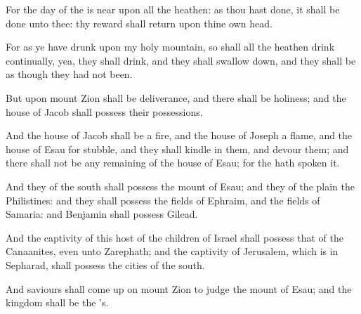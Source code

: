 \verse For the day of the \LORD is near upon all the heathen: as thou hast done, it shall be done unto thee: thy reward shall return upon thine own head.

\verse For as ye have drunk upon my holy mountain, so shall all the heathen drink continually, yea, they shall drink, and they shall swallow down, and they shall be as though they had not been.

\verse But upon mount Zion shall be deliverance, and there shall be holiness; and the house of Jacob shall possess their possessions.

\verse And the house of Jacob shall be a fire, and the house of Joseph a flame, and the house of Esau for stubble, and they shall kindle in them, and devour them; and there shall not be any remaining of the house of Esau; for the \LORD hath spoken it.

\verse And they of the south shall possess the mount of Esau; and they of the plain the Philistines: and they shall possess the fields of Ephraim, and the fields of Samaria: and Benjamin shall possess Gilead.

\verse And the captivity of this host of the children of Israel shall possess that of the Canaanites, even unto Zarephath; and the captivity of Jerusalem, which is in Sepharad, shall possess the cities of the south.

\verse And saviours shall come up on mount Zion to judge the mount of Esau; and the kingdom shall be the \LORD's.

